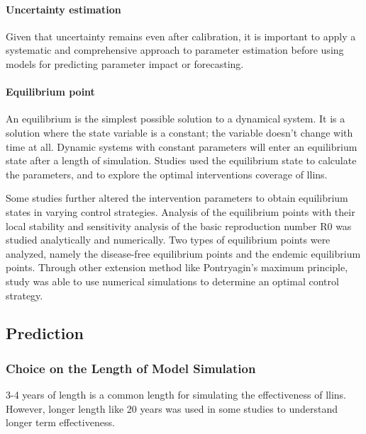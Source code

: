 \documentclass[a4paper, 12pt, twoside]{article}
\begin{document}
\paragraph{Uncertainty estimation}
Given that uncertainty remains even after calibration, it is important to apply a systematic and comprehensive approach to parameter estimation before using models for predicting parameter impact or forecasting.

\paragraph{Equilibrium point}%
\label{par:equilibrium_point}
An equilibrium is the simplest possible solution to a dynamical system.
It is a solution where the state variable is a constant; the variable doesn't change with time at all.
Dynamic systems with constant parameters will enter an equilibrium state after a length of simulation.
Studies\cite{Handari2020, Nwankwo2019,NiazArifin2013,Heesterbeek2015a,Karl2016,Olaniyi2020,Stuckey2014,Tompkins2013,Tompkins2013,Mbogo2018,Winskill2019,Smith2019,Briet2013} used the equilibrium state to calculate the parameters, and to explore the optimal interventions coverage of \gls{llins}.

Some studies further altered the intervention parameters to obtain equilibrium states in varying control strategies.
Analysis of the equilibrium points with their local stability and sensitivity analysis of the basic reproduction number \gls{R0} was studied analytically and numerically.
Two types of equilibrium points were analyzed, namely the disease-free equilibrium points and the endemic equilibrium points.
Through other extension method like Pontryagin’s maximum principle, study was able to use numerical simulations to determine an optimal control strategy\cite{Tchoumi2020}.

\subsection{Prediction}%
\label{sub:prediction}

\subsubsection{Choice on the Length of Model Simulation}
3-4 years of length is a common length for simulating the effectiveness of \gls{llins}. However, longer length like 20 years was used in some studies to understand longer term effectiveness\cite{Walker2016}.
\end{document}
